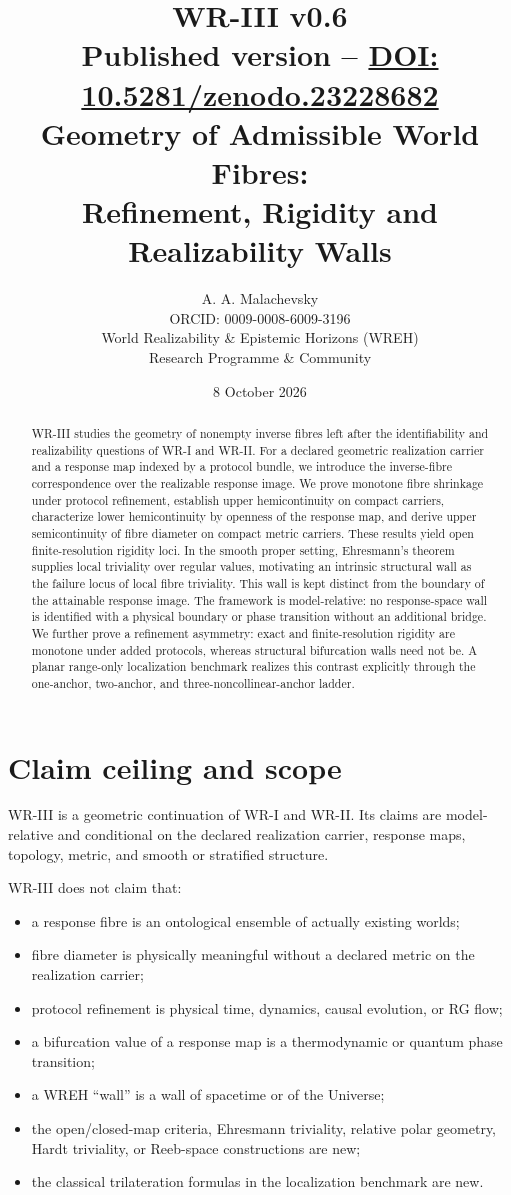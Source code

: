 \documentclass[11pt]{article}
\title{\textbf{WR-III v0.6}\\[2pt]
\normalsize Published version -- \href{https://doi.org/10.5281/zenodo.23228682}{DOI: 10.5281/zenodo.23228682}\\[6pt]
\large Geometry of Admissible World Fibres:\\
Refinement, Rigidity and Realizability Walls}
\author{A. A. Malachevsky\\
ORCID: 0009-0008-6009-3196\\
World Realizability \& Epistemic Horizons (WREH)\\
Research Programme \& Community}
\date{8 October 2026}
\begin{document}
\maketitle

\begin{abstract}
WR-III studies the geometry of nonempty inverse fibres left after the
identifiability and realizability questions of WR-I and WR-II. For a declared
geometric realization carrier and a response map indexed by a protocol bundle,
we introduce the inverse-fibre correspondence over the realizable response
image. We prove monotone fibre shrinkage under protocol refinement, establish
upper hemicontinuity on compact carriers, characterize lower hemicontinuity by
openness of the response map, and derive upper semicontinuity of fibre diameter
on compact metric carriers. These results yield open finite-resolution
rigidity loci. In the smooth proper setting, Ehresmann's theorem supplies local
triviality over regular values, motivating an intrinsic structural wall as the
failure locus of local fibre triviality. This wall is kept distinct from the
boundary of the attainable response image. The framework is model-relative:
no response-space wall is identified with a physical boundary or phase
transition without an additional bridge. We further prove a refinement
asymmetry: exact and finite-resolution rigidity are monotone under added
protocols, whereas structural bifurcation walls need not be. A planar
range-only localization benchmark realizes this contrast explicitly through
the one-anchor, two-anchor, and three-noncollinear-anchor ladder.
\end{abstract}

\section{Claim ceiling and scope}

WR-III is a geometric continuation of WR-I and WR-II. Its claims are
model-relative and conditional on the declared realization carrier, response
maps, topology, metric, and smooth or stratified structure.

WR-III does not claim that:
\begin{itemize}
\item a response fibre is an ontological ensemble of actually existing worlds;
\item fibre diameter is physically meaningful without a declared metric on the realization carrier;
\item protocol refinement is physical time, dynamics, causal evolution, or RG flow;
\item a bifurcation value of a response map is a thermodynamic or quantum phase transition;
\item a WREH ``wall'' is a wall of spacetime or of the Universe;
\item the open/closed-map criteria, Ehresmann triviality, relative polar geometry, Hardt triviality, or Reeb-space constructions are new;
\item the classical trilateration formulas in the localization benchmark are new.
\end{itemize}
\end{document}
